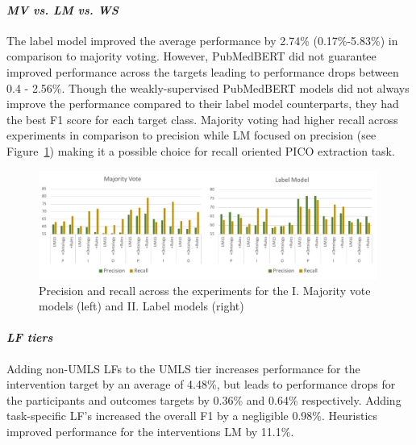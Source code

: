 \documentclass[10.7pt,]{article}
\let\oldparagraph\paragraph
\renewcommand{\paragraph}[1]{\oldparagraph{#1}\mbox{}}
\begin{document}
\paragraph{\textit{MV vs. LM vs. WS}}
The label model improved the average performance by 2.74\% (0.17\%-5.83\%) in comparison to majority voting.
However, PubMedBERT did not guarantee improved performance across the targets leading to performance drops between 0.4 - 2.56\%.
Though the weakly-supervised PubMedBERT models did not always improve the performance compared to their label model counterparts, they had the best F1 score for each target class.
Majority voting had higher recall across experiments in comparison to precision while LM focused on precision (see Figure~\ref{fig:precRecall}) making it a possible choice for recall oriented PICO extraction task.
%
\begin{figure}
    \centering
    \includegraphics[width=0.99\textwidth]{figures/precRecall.pdf}
    \caption{Precision and recall across the experiments for the I. Majority vote models (left) and II. Label models (right)}
    \label{fig:precRecall}
\end{figure}

\paragraph{\textit{LF tiers}}
Adding non-UMLS LFs to the UMLS tier increases performance for the intervention target by an average of 4.48\%, but leads to performance drops for the participants and outcomes targets by 0.36\% and 0.64\% respectively.
Adding task-specific LF's increased the overall F1 by a negligible 0.98\%.
Heuristics improved performance for the interventions LM by 11.1\%.
%
\end{document}
